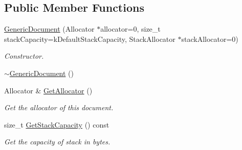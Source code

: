 \subsection*{Public Member Functions}
\begin{DoxyCompactItemize}
\item 
\hyperlink{classGenericDocument_a6b1c313ad538cafc4d23d4bd5f97178c}{Generic\+Document} (Allocator $\ast$allocator=0, size\+\_\+t stack\+Capacity=k\+Default\+Stack\+Capacity, Stack\+Allocator $\ast$stack\+Allocator=0)
\begin{DoxyCompactList}\small\item\em Constructor. \end{DoxyCompactList}\item 
\hyperlink{classGenericDocument_aa9f980909298a4de32f66526484820bf}{$\sim$\+Generic\+Document} ()
\item 
Allocator \& \hyperlink{classGenericDocument_aa4609d6b19f86aec1a6b96edf2c27686}{Get\+Allocator} ()
\begin{DoxyCompactList}\small\item\em Get the allocator of this document. \end{DoxyCompactList}\item 
size\+\_\+t \hyperlink{classGenericDocument_aa99f03016f4907332fcf70aadb645194}{Get\+Stack\+Capacity} () const 
\begin{DoxyCompactList}\small\item\em Get the capacity of stack in bytes. \end{DoxyCompactList}\end{DoxyCompactItemize}
